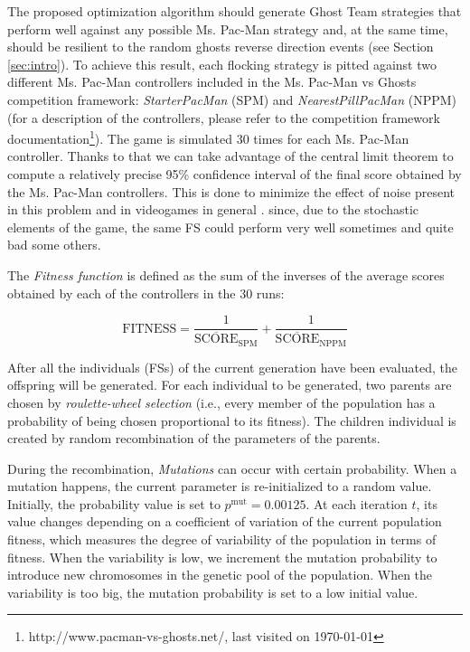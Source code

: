 \documentclass[a4paper]{llncs}
\begin{document}
The proposed optimization algorithm should generate Ghost Team strategies that perform well against any possible Ms. Pac-Man strategy and, at the same time, should be resilient to the random ghosts reverse direction events (see Section \ref{sec:intro}). To achieve this result, each flocking strategy is pitted against two different Ms. Pac-Man controllers included in the Ms. Pac-Man vs Ghosts competition framework: \textit{StarterPacMan} (SPM) and \textit{NearestPillPacMan} (NPPM) (for a description of the controllers, please refer to the competition framework documentation\footnote{http://www.pacman-vs-ghosts.net/, last visited on {\today}}). The game is simulated 30 times for each Ms. Pac-Man
controller. Thanks to that we can take advantage of the central limit
theorem to compute a relatively precise 95\% confidence interval of
the final score obtained by the Ms. Pac-Man controllers. This is done to minimize the effect of noise present in this problem and in videogames in general \cite{Mora12}. since, due to the stochastic elements of the game, the same FS could perform very well sometimes and quite bad some others. 

The \textit{Fitness function} is defined as the sum of the inverses of the average scores obtained by each of the controllers in the 30 runs:

\begin{small}
\begin{equation}
\mathrm{FITNESS} = \frac{1}{\overline{\mathrm{SCORE}}_\mathrm{SPM}} + \frac{1}{\overline{\mathrm{SCORE}}_\mathrm{NPPM}}
\end{equation}
\end{small}

After all the individuals (FSs) of the current generation have been evaluated, the offspring will be generated. For each individual to be generated, two parents are chosen by \textit{roulette-wheel selection}  (i.e., every member of the population has a probability of being chosen proportional to its fitness). The children individual is created by random recombination of the parameters of the parents.

During the recombination, \textit{Mutations} can occur with certain probability. When a mutation happens, the current parameter is re-initialized to a random value. Initially, the probability value is set to $p^\mathrm{mut} =
0.00125$. At each iteration $t$, its value changes depending on a coefficient of variation of the current population fitness, which measures the degree of variability of the population in terms of fitness. When the variability is low, we increment the mutation probability to introduce new chromosomes in the genetic pool of the population. When the variability is too big, the mutation probability is set to a low initial value.
\end{document}
